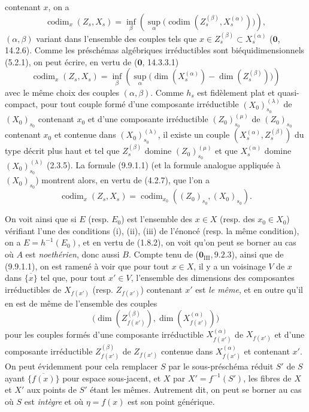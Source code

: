
contenant $x$, on a
\[
\operatorname{codim}_x(Z_s,X_s)=
\inf_\beta\left(\sup_\alpha
\bigl(\operatorname{codim}(Z_s^{(\beta)},X_s^{(\alpha)})\bigr)\right),
\]
$(\alpha,\beta)$ variant dans l'ensemble des couples tels que
$x\in Z_s^{(\beta)}\subset X_s^{(\alpha)}$ ($\mathbf 0$, 14.2.6). Comme les
préschémas algébriques irréductibles sont biéquidimensionnels (5.2.1), on peut
écrire, en vertu de ($\mathbf 0$, 14.3.3.1)
\begin{equation}
\tag{9.9.1.1}
\label{IV.9.9.1.1-fr}
\operatorname{codim}_x(Z_s,X_s)=
\inf_\beta\left(\sup_\alpha
\bigl(\dim(X_s^{(\alpha)})-\dim(Z_s^{(\beta)})\bigr)\right)
\end{equation}
avec le même choix des couples $(\alpha,\beta)$. Comme $h_s$ est fidèlement
plat et quasi-compact, pour tout couple formé d'une composante irréductible
$(X_0)_{s_0}^{(\lambda)}$ de $(X_0)_{s_0}$ contenant $x_0$ et d'une composante
irréductible $(Z_0)_{s_0}^{(\mu)}$ de $(Z_0)_{s_0}$ contenant $x_0$ et contenue
dans $(X_0)_{s_0}^{(\lambda)}$, il existe un couple
$(X_s^{(\alpha)},Z_s^{(\beta)})$ du type décrit plus haut et tel que
$Z_s^{(\beta)}$ domine $(Z_0)_{s_0}^{(\mu)}$ et que $X_s^{(\alpha)}$ domine
$(X_0)_{s_0}^{(\lambda)}$ (2.3.5). La formule (9.9.1.1) (et la formule analogue
appliquée à $(X_0)_{s_0}$) montrent alors, en vertu de (4.2.7), que l'on a
\[
\operatorname{codim}_x(Z_s,X_s)=
\operatorname{codim}_{x_0}((Z_0)_{s_0},(X_0)_{s_0}).
\]

On voit ainsi que si $E$ (resp. $E_0$) est l'ensemble des $x\in X$ (resp. des
$x_0\in X_0$) vérifiant l'une des conditions (i), (ii), (iii) de l'énoncé
(resp. la même condition), on a $E=h^{-1}(E_0)$, et en vertu de (1.8.2), on
voit qu'on peut se borner au cas où $A$ est \emph{noethérien}, donc aussi $B$.
Compte tenu de ($\mathbf 0_{\mathrm{III}},9.2.3$), ainsi que de (9.9.1.1), on
est ramené à voir que pour tout $x\in X$, il y a un voisinage $V$ de $x$ dans
$\overline{\{x\}}$ tel que, pour tout $x'\in V$, l'ensemble des dimensions des
composantes irréductibles de $X_{f(x')}$ (resp. $Z_{f(x')}$) contenant $x'$ est
\emph{le même}, et en outre qu'il en est de même de l'ensemble des couples
\[
\bigl(\dim(Z_{f(x')}^{(\beta)}),\dim(X_{f(x')}^{(\alpha)})\bigr)
\]
pour les couples formés d'une composante irréductible $X_{f(x')}^{(\alpha)}$
de $X_{f(x')}$ et d'une composante irréductible $Z_{f(x')}^{(\beta)}$ de
$Z_{f(x')}$ contenue dans $X_{f(x')}^{(\alpha)}$ et contenant $x'$. On peut
évidemment pour cela remplacer $S$ par le sous-préschéma réduit $S'$ de $S$
ayant $\overline{\{f(x)\}}$ pour espace sous-jacent, et $X$ par
$X'=f^{-1}(S')$, les fibres de $X$ et $X'$ aux points de $S'$ étant les mêmes.
Autrement dit, on peut se borner au cas où $S$ est \emph{intègre} et où
$\eta=f(x)$ est son point générique.

